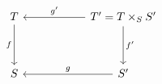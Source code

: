 \[
\begin{tikzcd}[column sep=5.5em, row sep=3.4em]
 T \arrow[d,"f"']
 &
 T'=T\times_S S' \arrow[l,"g'"'] \arrow[d,"f'"]
 \\
 S
 &
 S' \arrow[l,"g"']
\end{tikzcd}
\]

